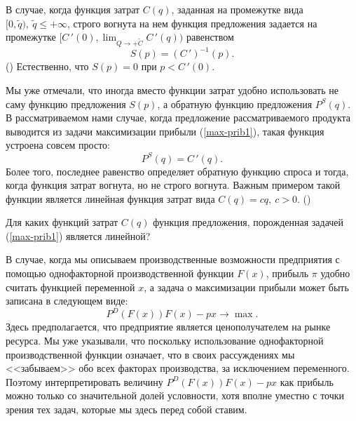     В случае, когда функция затрат $C(q)$, заданная
    на промежутке вида $[0,\tilde{q}), \ \tilde{q}\leq+\infty$, строго вогнута на нем
    функция предложения задается на промежутке
    $[C\,'(0),\lim_{Q\rightarrow+\tilde{C}}C\,'(q))$
    равенством
    \[S(p)=(C\,')^{-1}(p).\]          ()
    Естественно, что $S(p)=0$ при $p<C\,'(0)$.




    Мы уже отмечали, что иногда вместо функции затрат удобно
    использовать не саму функцию предложения $S(p)$, а обратную функцию
    предложения $P^{S}(q)$. В рассматриваемом нами
    случае, когда предложение рассматриваемого продукта выводится из задачи
    максимизации прибыли (\ref{max-prib1}), такая функция устроена
    совсем просто:
    \[P^{S}(q)=C\,'(q).\]
    Более того, последнее равенство определяет обратную функцию
    спроса и тогда, когда функция затрат вогнута, но не строго
    вогнута. Важным примером такой функции является линейная функция
    затрат вида $C(q)=cq, \ c>0.$          ()


\begin{exer}
    Для каких функций затрат $C(q)$ функция предложения, порожденная
    задачей (\ref{max-prib1}) является линейной?
\end{exer}





    В случае, когда мы описываем производственные возможности
    предприятия с помощью однофакторной производственной функции
    $F(x)$, прибыль $\pi$ удобно считать функцией переменной $x$,
    а задача о максимизации прибыли может быть записана в
    следующем виде:
\begin{equation}
\label{max-prib-2}
    P^{D}(F(x))F(x)-px\rightarrow\max.
\end{equation}
    Здесь предполагается, что предприятие является ценополучателем
    на рынке ресурса.
     Мы уже указывали, что
    поскольку использование однофакторной производственной функции
    означает, что в своих рассуждениях мы <<забываем>> обо всех
    факторах производства, за исключением переменного. Поэтому
    интерпретировать величину $P^{D}(F(x))F(x)-px$ как прибыль можно
    только со значительной долей условности, хотя вполне уместно с
    точки зрения тех задач, которые мы здесь перед собой ставим.





